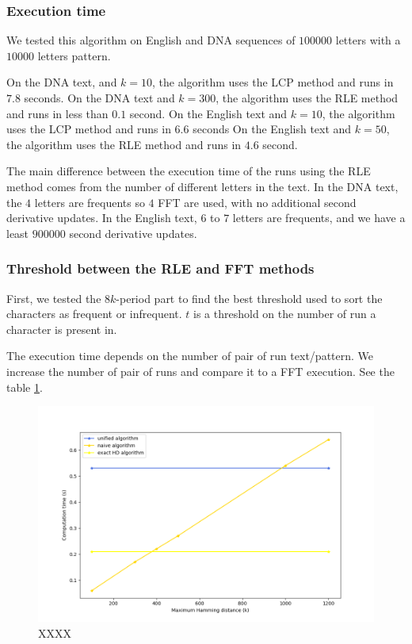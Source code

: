 \documentclass[preprint,12pt]{elsarticle}
\begin{document}
\subsubsection*{Execution time}

We tested this algorithm on English and DNA sequences of $100 000$ letters with a $10 000$ letters pattern.

On the DNA text, and $k = 10$, the algorithm uses the LCP method and runs in $7.8$ seconds.
On the DNA text and $k = 300$, the algorithm uses the RLE method and runs in less than $0.1$ second.
On the English text and $k = 10$, the algorithm uses the LCP method and runs in $6.6$ seconds
On the English text and $k = 50$, the algorithm uses the RLE method and runs in $4.6$ second.

The main difference between the execution time of the runs using the RLE method %
comes from the number of different letters in the text.
In the DNA text, the $4$ letters are frequents so $4$ FFT are used,
with no additional second derivative updates.
In the English text, $6$ to $7$ letters are frequents, and we have a least $900 000$ second derivative updates.



\subsubsection*{Threshold between the RLE and FFT methods}

First, we tested the $8k$-period part to find the best threshold
used to sort the characters as frequent or infrequent.
$t$ is a threshold on the number of run a character is present in.

The execution time depends on the number of pair of run text/pattern.
We increase the number of pair of runs and compare it to a FFT execution.
See the table \ref{OptiComp}.

\begin{figure}[h]
\includegraphics[scale=0.45]{./figures/OptiComparOptiNaivHD.png}
\caption{XXXX}
\label{OptiComp}
\end{figure}
\end{document}
